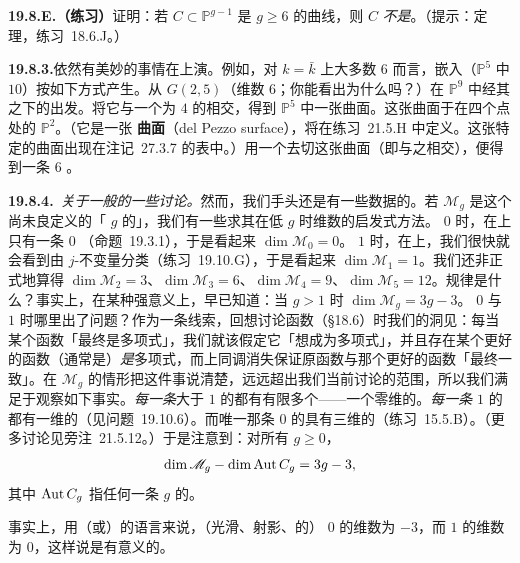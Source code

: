 \textbf{19.8.E.（练习）}\quad 证明：若 $C\subset\mathbb{P}^{g-1}$ 是\trGenus{} $g\ge 6$ 的\trCanonical{}曲线，则 $C$ \emph{不是}\trCompleteIntersection。（提示：\trBezout{}定理，\mbox{练习~18.6.J}。）

\textbf{19.8.3.}\quad 依然有美妙的事情在上演。例如，对 $k=\bar{k}$ 上大多数\trGenus{} $6$ \trCurve{}而言，\trCanonical{}嵌入（$\mathbb{P}^5$ 中\trDegree{} $10$）按如下方式产生。从 $G(2,5)$（维数 $6$；你能看出为什么吗？）在 $\mathbb{P}^9$ 中经其\trPluckerEmbedding{}之下的\trCompleteIntersection{}出发。将它与一个\trCodimension{}为 $4$ 的\trLinearSpace{}相交，得到 $\mathbb{P}^5$ 中一张\trSmooth{}曲面。这张曲面\trIsomorphic{}于在四个点处\trBlowup{}的 $\mathbb{P}^2$。（它是一张 \textbf{\trDelPezzo{}曲面}（del Pezzo surface），将在\mbox{练习~21.5.H} 中定义。这张特定的曲面出现在\mbox{注记~27.3.7} 的表中。）用一个\trQuadricHypersurface{}去切这张曲面（即与之相交），便得到一条\trGenus{} $6$ \trCurve。

\textbf{19.8.4.}\ \emph{关于一般\trGenus{}\trCurve{}的一些讨论。}\quad 然而，我们手头还是有一些数据的。若 $\mathscr{M}_g$ 是这个尚未良定义的「\trGenus{} $g$ \trCurve{}的\trModuliSpace」，我们有一些求其在低 $g$ 时维数的启发式方法。\trGenus{} $0$ 时，在\trAlgClosedField{}上只有一条\trGenus{} $0$ \trCurve（\mbox{命题~19.3.1}），于是看起来 $\dim\mathscr{M}_0=0$。\trGenus{} $1$ 时，在\trAlgClosedField{}上，我们很快就会看到\trEllipticCurve{}由 $j$-不变量分类（\mbox{练习~19.10.G}），于是看起来 $\dim\mathscr{M}_1=1$。我们还非正式地算得 $\dim\mathscr{M}_2=3$、$\dim\mathscr{M}_3=6$、$\dim\mathscr{M}_4=9$、$\dim\mathscr{M}_5=12$。规律是什么？事实上，在某种强意义上，\trRiemann{}早已知道：当 $g>1$ 时 $\dim\mathscr{M}_g=3g-3$。\trGenus{} $0$ 与\trGenus{} $1$ 时哪里出了问题？作为一条线索，回想讨论\trHilbert{}函数（\S18.6）时我们的洞见：每当某个函数「最终是多项式」，我们就该假定它「想成为多项式」，并且存在某个更好的函数（通常是\trEulerCharacteristic）\emph{是}多项式，而上同调消失保证原函数与那个更好的函数「最终一致」。在 $\mathscr{M}_g$ 的情形把这件事说清楚，远远超出我们当前讨论的范围，所以我们满足于观察如下事实。\emph{每一条}\trGenus{}大于 $1$ 的\trRegular{}\trCurve{}都有有限多个\trAutomorphism——一个零维的\trAutomorphismGroup。\emph{每一条}\trGenus{} $1$ 的\trRegular{}\trCurve{}都有一维的\trAutomorphismGroup（见\mbox{问题~19.10.6}）。而唯一那条\trGenus{} $0$ 的\trRegular{}\trCurve{}具有三维的\trAutomorphismGroup（\mbox{练习~15.5.B}）。（更多讨论见\mbox{旁注~21.5.12}。）于是注意到：对所有 $g\ge 0$，
\[
\dim\mathscr{M}_g-\dim\operatorname{Aut} C_g=3g-3,
\]
其中 $\operatorname{Aut} C_g$ 指任何一条\trGenus{} $g$ \trCurve{}的\trAutomorphismGroup。

事实上，用\trStack（或\trOrbifold）的语言来说，（光滑、射影、\trGeometricallyIrreducible{}的）\trGenus{} $0$ \trCurve{}的\trModuliSpace{}维数为 $-3$，而\trGenus{} $1$ \trCurve{}的\trModuliSpace{}维数为 $0$，这样说是有意义的。



